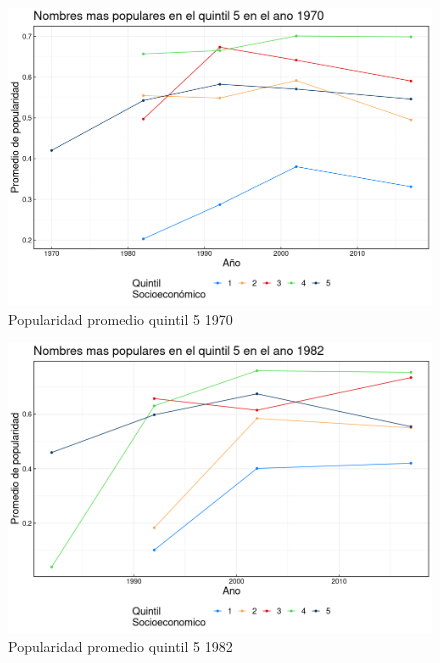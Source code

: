 \begin{landscape}
\begin{figure}[H]
\begin{center}
    \includegraphics[width=20cm]{plot/popularidad_1970.png}
    \caption{Popularidad promedio quintil 5 1970}
    \label{fig:popularidad_1970}
\end{center}
\end{figure}
\end{landscape}

\begin{landscape}
\begin{figure}[H]
\begin{center}
    \includegraphics[width=20cm]{plot/popularidad_1982.png}
    \caption{Popularidad promedio quintil 5 1982}
    \label{fig:popularidad_1982}
\end{center}
\end{figure}
\end{landscape}

